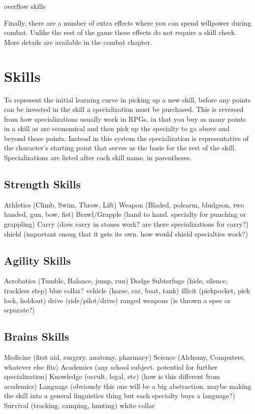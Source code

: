 \documentclass[twocolumn]{report}
\begin{document}
overflow skills

Finally, there are a number of extra effects where you can spend willpower during combat.  Unlike the rest of the game these effects do not require a skill check.  More details are available in the combat chapter.
\chapter{Skills} 
To represent the initial learning curve in picking up a new skill, before any points can be invested in the skill a specialization must be purchased.  This is reversed from how specializations usually work in RPGs, in that you buy as many points in a skill as are economical and then pick up the specialty to go above and beyond those points.  Instead in this system the specialization is representative of the character's starting point that serves as the basis for the rest of the skill.  Specializations are listed after each skill name, in parentheses.

\section{Strength Skills}
Athletics (Climb, Swim, Throw, Lift)
Weapon (Bladed, polearm, bludgeon, two handed, gun, bow, fist)
Brawl/Grapple (hand to hand.  specialty for punching or grappling)
Carry (does carry in stones work?  are there specializations for carry?)
shield (important enoug that it gets its own.  how would shield specialties work?)

\section{Agility Skills}
Acrobatics (Tumble, Balance, jump, run)
Dodge
Subterfuge (hide, silence, trackless step)
blue collar?
vehicle (horse, car, boat, tank)
illicit (pickpocket, pick lock, holdout)
drive (ride/pilot/drive)
ranged weapons (is thrown a spec or separate?)

\section{Brains Skills}
Medicine (first aid, surgery, anatomy, pharmacy)
Science (Alchemy, Computers, whatever else fits)
Academics (any school subject.  potential for further specialization)
Knowledge (occult, legal, etc) (how is this different from academics)
Language (obviously this one will be a big abstraction.  maybe making the skill into a general linguistics thing but each specialty buys a language?)
Survival (tracking, camping, hunting)
white collar
\end{document}
